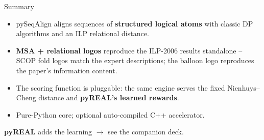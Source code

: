 \documentclass[aspectratio=169,10pt]{beamer}
\begin{document}
\begin{frame}{Summary}
  \begin{itemize}
    \item pySeqAlign aligns sequences of \textbf{structured logical atoms} with
          classic DP algorithms and an ILP relational distance.
    \item \textbf{MSA + relational logos} reproduce the ILP-2006 results
          standalone -- SCOP fold logos match the expert descriptions; the
          balloon logo reproduces the paper's information content.
    \item The scoring function is pluggable: the \alert{same} engine serves the
          fixed Nienhuys--Cheng distance and \textbf{pyREAL's learned rewards}.
    \item Pure-Python core; optional auto-compiled C++ accelerator.
  \end{itemize}
  \vspace{0.6em}
  \begin{center}
    \small \textbf{pyREAL} adds the learning $\rightarrow$ see the companion deck.
  \end{center}
\end{frame}
\end{document}

